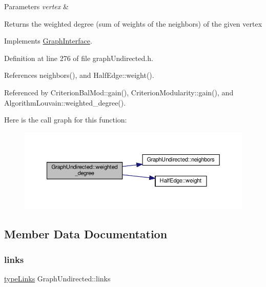 \begin{DoxyParams}{Parameters}
{\em vertex} & \\
\hline
\end{DoxyParams}
\begin{DoxyReturn}{Returns}
the weighted degree (sum of weights of the neighbors) of the given vertex 
\end{DoxyReturn}


Implements \hyperlink{classGraphInterface_a3a4bd9e37e69a4488a48f781e36ea686}{Graph\+Interface}.



Definition at line 276 of file graph\+Undirected.\+h.



References neighbors(), and Half\+Edge\+::weight().



Referenced by Criterion\+Bal\+Mod\+::gain(), Criterion\+Modularity\+::gain(), and Algorithm\+Louvain\+::weighted\+\_\+degree().

Here is the call graph for this function\+:
\nopagebreak
\begin{figure}[H]
\begin{center}
\leavevmode
\includegraphics[width=350pt]{classGraphUndirected_ad2b1cd9a6dded42bd5431134aba26612_cgraph}
\end{center}
\end{figure}


\subsection{Member Data Documentation}
\mbox{\label{classGraphUndirected_a9325f02f5d038919f3d5db197da83214}} 
\subsubsection{\texorpdfstring{links}{links}}
{\footnotesize\ttfamily \hyperlink{graphInterface_8h_a31ca98f3d40433c4c9e20fe8901d4392}{type\+Links} Graph\+Undirected\+::links\hspace{0.3cm}{\ttfamily [private]}}



